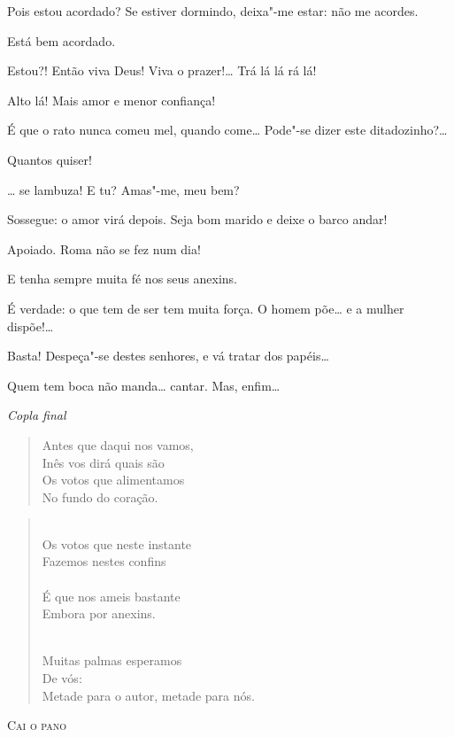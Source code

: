   Pois estou acordado? Se estiver dormindo, deixa"-me estar: não me
acordes.

  Está bem acordado.

  Estou?!  Então viva Deus! Viva o
prazer!\ldots{} Trá lá lá rá lá! 

   Alto lá! Mais amor e menor confiança!

  É que o rato nunca comeu mel, quando come\ldots{} 
Pode"-se dizer este ditadozinho?\ldots{}

  Quantos quiser!

   \ldots{} se lambuza!   E tu? Amas"-me, meu bem?

  Sossegue: o amor virá depois. Seja bom marido e deixe o
barco andar!

  Apoiado. Roma não se fez num dia!

  E tenha sempre muita fé nos seus anexins.

  É verdade: o que tem de ser tem muita força. O homem põe\ldots{}
e a mulher dispõe!\ldots{}

  Basta! Despeça"-se destes senhores, e vá tratar dos papéis\ldots{}

  Quem tem boca não manda\ldots{} cantar. Mas, enfim\ldots{} 
\smallskip


{\smallskip\raggedleft\itshape Copla final\par}
\begin{verse} 
Antes que daqui nos vamos,\\
Inês vos dirá quais são\\
Os votos que alimentamos\\
No fundo do coração.  
\end{verse}

\begin{verse}
\\
Os votos que neste instante\\
Fazemos nestes confins\\
\\
É que nos ameis bastante\\
Embora por anexins.

\\
Muitas palmas esperamos\\
\quad De vós:\\
Metade para o autor, metade para nós.
\end{verse}

\vspace{1cm}

\begin{center}
\textsc{Cai o pano}
\end{center}

